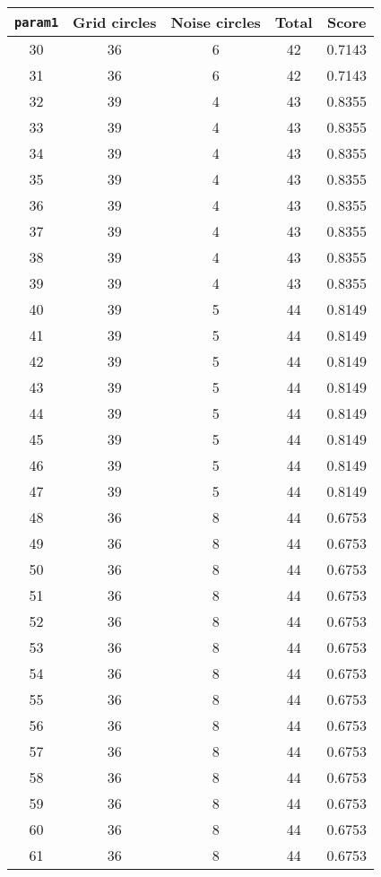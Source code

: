 \documentclass[letterpaper, 12pt]{article}
\begin{document}
\begin{longtable}{|c|c|c|c|c|}
\hline
\textbf{\texttt{param1}} & \textbf{Grid circles} & \textbf{Noise circles} & \textbf{Total} & \textbf{Score} \\
\hline
30 & 36 & 6 & 42 & 0.7143 \\
\hline
31 & 36 & 6 & 42 & 0.7143 \\
\hline
32 & 39 & 4 & 43 & 0.8355 \\
\hline
33 & 39 & 4 & 43 & 0.8355 \\
\hline
34 & 39 & 4 & 43 & 0.8355 \\
\hline
35 & 39 & 4 & 43 & 0.8355 \\
\hline
36 & 39 & 4 & 43 & 0.8355 \\
\hline
37 & 39 & 4 & 43 & 0.8355 \\
\hline
38 & 39 & 4 & 43 & 0.8355 \\
\hline
39 & 39 & 4 & 43 & 0.8355 \\
\hline
40 & 39 & 5 & 44 & 0.8149 \\
\hline
41 & 39 & 5 & 44 & 0.8149 \\
\hline
42 & 39 & 5 & 44 & 0.8149 \\
\hline
43 & 39 & 5 & 44 & 0.8149 \\
\hline
44 & 39 & 5 & 44 & 0.8149 \\
\hline
45 & 39 & 5 & 44 & 0.8149 \\
\hline
46 & 39 & 5 & 44 & 0.8149 \\
\hline
47 & 39 & 5 & 44 & 0.8149 \\
\hline
48 & 36 & 8 & 44 & 0.6753 \\
\hline
49 & 36 & 8 & 44 & 0.6753 \\
\hline
50 & 36 & 8 & 44 & 0.6753 \\
\hline
51 & 36 & 8 & 44 & 0.6753 \\
\hline
52 & 36 & 8 & 44 & 0.6753 \\
\hline
53 & 36 & 8 & 44 & 0.6753 \\
\hline
54 & 36 & 8 & 44 & 0.6753 \\
\hline
55 & 36 & 8 & 44 & 0.6753 \\
\hline
56 & 36 & 8 & 44 & 0.6753 \\
\hline
57 & 36 & 8 & 44 & 0.6753 \\
\hline
58 & 36 & 8 & 44 & 0.6753 \\
\hline
59 & 36 & 8 & 44 & 0.6753 \\
\hline
60 & 36 & 8 & 44 & 0.6753 \\
\hline
61 & 36 & 8 & 44 & 0.6753 \\

\end{longtable}
\end{document}

